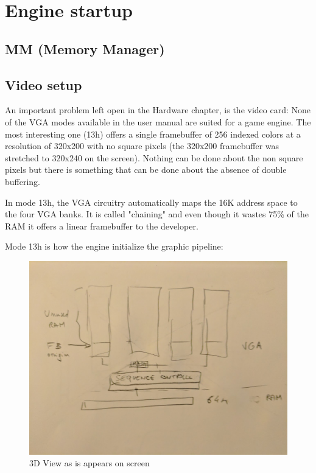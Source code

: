 \documentclass[book.tex]{subfiles}
\begin{document}
\section{Engine startup}
\subsection{MM (Memory Manager)}


\subsection{Video setup}
An important problem left open in the Hardware chapter, is the video card: None of the VGA modes available in the user manual are suited for a game engine. The most interesting one (13h) offers a single framebuffer of 256 indexed colors at a resolution of 320x200 with no square pixels (the 320x200 framebuffer was stretched to 320x240 on the screen). Nothing can be done about the non square pixels but there is something that can be done about the absence of double buffering.\\
\par
 In mode 13h, the VGA circuitry automatically maps the 16K address space to the four VGA banks. It is called "chaining" and even though it wastes 75\% of the RAM it offers a linear framebuffer to the developer.\\
 \par
 Mode 13h is how the engine initialize the graphic pipeline:\\
 \begin{minipage}{\textwidth}

\end{minipage}
 \par
\begin{figure}[H]
\centering
 \includegraphics[width=\textwidth]{imgs/vga_layout/wasted_vga_ram.png}
 \caption{3D View as is appears on screen} \label{fig:vga_layout_in_3D}
 \end{figure}
\end{document}
